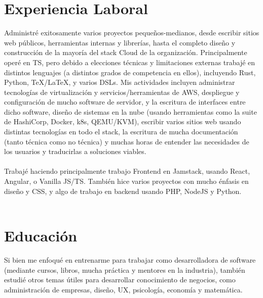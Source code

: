 \documentclass[11pt,a4paper,sans]{moderncv}
\begin{document}
\section{Experiencia Laboral}
{
{\flushleft Administré exitosamente varios proyectos pequeños-medianos, desde escribir sitios web públicos, herramientas internas y librerías, hasta el completo diseño y construcción de la mayoría del stack Cloud de la organización. Principalmente operé en TS, pero debido a elecciones técnicas y limitaciones externas trabajé en distintos lenguajes (a distintos grados de competencia en ellos), incluyendo Rust, Python, TeX/LaTeX, y varios DSLs. Mis actividades incluyen administrar tecnologías de virtualización y servicios/herramientas de AWS, despliegue y configuración de mucho software de servidor, y la escritura de interfaces entre dicho software, diseño de sistemas en la nube (usando herramientas como la suite de HashiCorp, Docker, k8s, QEMU/KVM), escribir varios sitios web usando distintas tecnologías en todo el stack, la escritura de mucha documentación (tanto técnica como no técnica) y muchas horas de entender las necesidades de los usuarios y traducirlas a soluciones viables.   } \hfill \\[-1em]
\hfill \\[1em]

{\flushleft Trabajé haciendo principalmente trabajo Frontend en Jamstack, usando React, Angular, o Vanilla JS/TS. También hice varios proyectos con mucho énfasis en diseño y CSS, y algo de trabajo en backend usando PHP, NodeJS y Python.} \hfill \\[-1em]
\hfill \\




\section{Educación}
{\flushleft Si bien me enfoqué en entrenarme para trabajar como desarrolladora de software (mediante cursos, libros, mucha práctica y mentores en la industria), también estudié otros temas útiles para desarrollar conocimiento de negocios, como administración de empresas, diseño, UX, psicología, economía y matemática.}
\hfill \\[1em]

}
\end{document}
